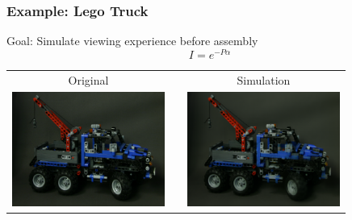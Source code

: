 \documentclass[12pt, compress]{beamer}
\begin{document}
\begin{frame}[fragile]
	\frametitle{Example: Lego Truck}
	
	Goal: Simulate viewing experience before assembly
	\begin{equation*}
		I = e^{- P \alpha}
	\end{equation*}
	
	\begin{center}
		\begin{tabular}{c p{0cm} c}
			Original & & Simulation \\
			\includegraphics[width = 5cm]{images/layers_and_projections/legotruck/original/08_08}
			& & \includegraphics[width = 5cm]{images/layers_and_projections/legotruck/Reconstruction_of_view_(3,3)}
		\end{tabular}
	\end{center}

\end{frame}
\end{document}
